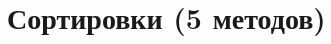 \documentclass[discrete.tex]{subfiles}
\begin{document}
\section{Сортировки (5 методов)}
\end{document}
